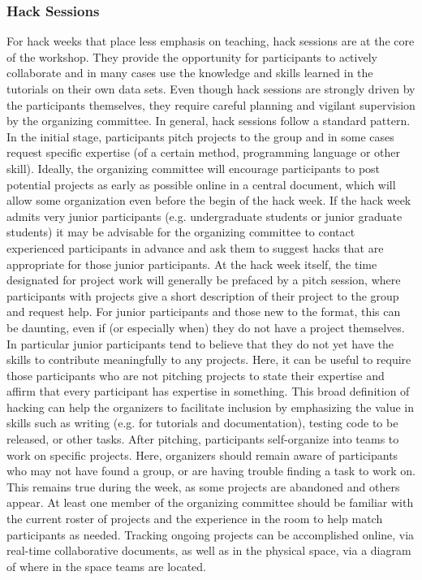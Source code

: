 \subsubsection{Hack Sessions}

For hack weeks that place less emphasis on teaching, hack sessions are at the core of the workshop. They provide the opportunity for participants to actively collaborate and in many cases use the knowledge and skills learned in the tutorials on their own data sets. Even though hack sessions are strongly driven by the participants themselves, they require careful planning and vigilant supervision by the organizing committee. In general, hack sessions follow a standard pattern. In the initial stage, participants pitch projects to the group and in some cases request specific expertise (of a certain method, programming language or other skill). Ideally, the organizing committee will encourage participants to post potential projects as early as possible online in a central document, which will allow some organization even before the begin of the hack week. If the hack week admits very junior participants (e.g. undergraduate students or junior graduate students) it may be advisable for the organizing committee to contact experienced participants in advance and ask them to suggest hacks that are appropriate for those junior participants.
At the hack week itself, the time designated for project work will generally be prefaced by a pitch session, where participants with projects give a short description of their project to the group and request help. For junior participants and those new to the format, this can be daunting, even if (or especially when) they do not have a project themselves. In particular junior participants tend to believe that they do not yet have the skills to contribute meaningfully to any projects. Here, it can be useful to require those participants who are not pitching projects to state their expertise and affirm that every participant has expertise in something. This broad definition of hacking can help the organizers to facilitate inclusion by emphasizing the value in skills such as writing (e.g. for tutorials and documentation), testing code to be released, or other tasks. After pitching, participants self-organize into teams to work on specific projects. Here, organizers should remain aware of participants who may not have found a group, or are having trouble finding a task to work on. This remains true during the week, as some projects are abandoned and others appear. At least one member of the organizing committee should be familiar with the current roster of projects and the experience in the room to help match participants as needed. Tracking ongoing projects can be accomplished online, via real-time collaborative documents, as well as in the physical space, via a diagram of where in the space teams are located.
